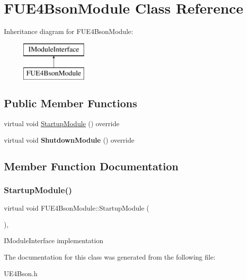 \hypertarget{class_f_u_e4_bson_module}{}\section{F\+U\+E4\+Bson\+Module Class Reference}
\label{class_f_u_e4_bson_module}
Inheritance diagram for F\+U\+E4\+Bson\+Module\+:\begin{figure}[H]
\begin{center}
\leavevmode
\includegraphics[height=2.000000cm]{class_f_u_e4_bson_module}
\end{center}
\end{figure}
\subsection*{Public Member Functions}
\begin{DoxyCompactItemize}
\item 
virtual void \mbox{\hyperlink{class_f_u_e4_bson_module_adcd0d99144d374de817306bb9e4229a5}{Startup\+Module}} () override
\item 
\mbox{\label{class_f_u_e4_bson_module_a17c1e6aa5c7c8cd1d189873f0f830a63}} 
virtual void {\bfseries Shutdown\+Module} () override
\end{DoxyCompactItemize}


\subsection{Member Function Documentation}
\mbox{\label{class_f_u_e4_bson_module_adcd0d99144d374de817306bb9e4229a5}} 
\subsubsection{\texorpdfstring{Startup\+Module()}{StartupModule()}}
{\footnotesize\ttfamily virtual void F\+U\+E4\+Bson\+Module\+::\+Startup\+Module (\begin{DoxyParamCaption}{ }\end{DoxyParamCaption})\hspace{0.3cm}{\ttfamily [override]}, {\ttfamily [virtual]}}

I\+Module\+Interface implementation 

The documentation for this class was generated from the following file\+:\begin{DoxyCompactItemize}
\item 
U\+E4\+Bson.\+h\end{DoxyCompactItemize}
